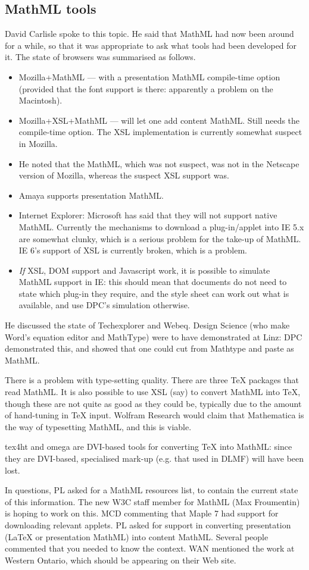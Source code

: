 \documentclass[11pt, a4paper]{article}
\begin{document}
\subsection{MathML tools}
David Carlisle spoke to this topic. He said that MathML had now been around
for a while, so that it was appropriate to ask what tools had been
developed for it. The state of browsers was summarised as follows.
\begin{itemize}
\item Mozilla+MathML --- with a presentation MathML compile-time option
(provided that the font support is there: apparently a problem on the
Macintosh).
\item Mozilla+XSL+MathML --- will let one add content MathML. Still needs
the compile-time option. The XSL implementation is currently somewhat
suspect in Mozilla.
\item[]He noted that the MathML, which was not suspect, was not in the
Netscape version of Mozilla, whereas the suspect XSL support was.
\item Amaya supports presentation MathML.
\item Internet Explorer: Microsoft has said that they will not support
native MathML. Currently the mechanisms to download a plug-in/applet into IE
5.x are somewhat clunky, which is a serious problem for the take-up of
MathML. IE 6's support of XSL is currently broken, which is a problem.
\item[]{\it If\/} XSL, DOM support and Javascript work, it is possible to
simulate MathML support in IE: this should mean that documents do not need
to state which plug-in they require, and the style sheet can work out what
is available, and use DPC's simulation otherwise.
\end{itemize}
He discussed the state of Techexplorer and Webeq. Design Science (who make
Word's equation editor and MathType) were to have demonstrated at Linz: DPC
demonstrated this, and showed that one could cut from Mathtype and paste as
MathML.
\par
There is a problem with type-setting quality. There are three \TeX{} packages
that read MathML. It is also possible to use XSL (say) to convert MathML
into \TeX, though these are not quite as good as they could be, typically
due to the amount of hand-tuning in \TeX{} input.
Wolfram Research would claim that Mathematica is the way of typesetting
MathML, and this is viable.
\par
tex4ht and omega are DVI-based tools for converting \TeX{} into MathML:
since they are DVI-based, specialised mark-up (e.g. that used in DLMF) will
have been lost.
\par
In questions, PL asked for a MathML resources list, to contain the current
state of this information. The new W3C staff member for MathML (Max
Froumentin) is hoping to work on this.
MCD commenting that Maple 7 had support for downloading relevant applets.
PL asked for support in converting presentation (\LaTeX{} or presentation
MathML) into content MathML. Several people commented that you needed to
know the context. WAN mentioned the work at Western Ontario, which should
be appearing on their Web site.
\end{document}
